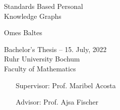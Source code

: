 \begin{titlepage}
    \begin{center}
        \vspace*{1cm}
        \Huge
        Standards Based Personal\\ Knowledge Graphs \\
        
        \vspace*{1cm}
        
        \Large
        Omes Baltes
      
        \vfill

        \large
        Bachelor's Thesis -- 15. July, 2022\\
        Ruhr University Bochum\\
        Faculty of Mathematics\\
        \vspace{1cm}

        \begin{itemize}[noitemsep, leftmargin=13.9em]
            \item[Supervisor:] Prof. Maribel Acosta 
            \item[Advisor:] Prof. Ajsa Fischer
        \end{itemize}
        
        
    \end{center}
\end{titlepage}